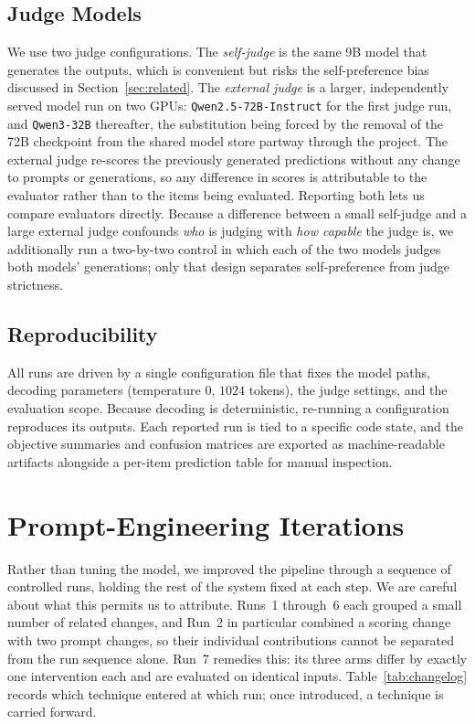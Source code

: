 \documentclass[onecolumn, 11pt]{IEEEtran}
\begin{document}
\subsection{Judge Models}
We use two judge configurations. The \emph{self-judge} is the same 9B model that generates the outputs, which is convenient but risks the self-preference bias discussed in Section~\ref{sec:related}. The \emph{external judge} is a larger, independently served model run on two GPUs: \texttt{Qwen2.5-72B-Instruct} for the first judge run, and \texttt{Qwen3-32B} thereafter, the substitution being forced by the removal of the 72B checkpoint from the shared model store partway through the project. The external judge re-scores the previously generated predictions without any change to prompts or generations, so any difference in scores is attributable to the evaluator rather than to the items being evaluated. Reporting both lets us compare evaluators directly. Because a difference between a small self-judge and a large external judge confounds \emph{who} is judging with \emph{how capable} the judge is, we additionally run a two-by-two control in which each of the two models judges both models' generations; only that design separates self-preference from judge strictness.

\subsection{Reproducibility}
All runs are driven by a single configuration file that fixes the model paths, decoding parameters (temperature $0$, $1024$ tokens), the judge settings, and the evaluation scope. Because decoding is deterministic, re-running a configuration reproduces its outputs. Each reported run is tied to a specific code state, and the objective summaries and confusion matrices are exported as machine-readable artifacts alongside a per-item prediction table for manual inspection.

\section{Prompt-Engineering Iterations}
\label{sec:iterations}

Rather than tuning the model, we improved the pipeline through a sequence of controlled runs, holding the rest of the system fixed at each step. We are careful about what this permits us to attribute. Runs~1 through~6 each grouped a small number of related changes, and Run~2 in particular combined a scoring change with two prompt changes, so their individual contributions cannot be separated from the run sequence alone. Run~7 remedies this: its three arms differ by exactly one intervention each and are evaluated on identical inputs. Table~\ref{tab:changelog} records which technique entered at which run; once introduced, a technique is carried forward.
\end{document}
